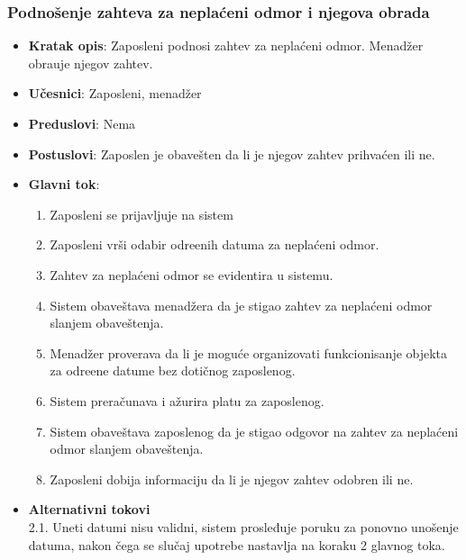  \subsubsection{Podno\v senje zahteva za nepla\'ceni odmor i njegova obrada }
 \begin{itemize}
    \item \textbf{Kratak opis}:
  Zaposleni podnosi zahtev za nepla\'ceni odmor. Menad\v zer obra\dj uje njegov zahtev.
    \item \textbf{Učesnici}:
    Zaposleni, menad\v zer
    \item \textbf{Preduslovi}: Nema
    \item \textbf{Postuslovi}:
    Zaposlen je obave\v sten da li je njegov zahtev prihva\'cen ili ne.
    \item \textbf{Glavni tok}:
    \begin{enumerate}
        \item Zaposleni se prijavljuje na sistem
        \item Zaposleni vr\v si odabir odre\dj enih datuma za nepla\'ceni odmor.
        \item Zahtev za nepla\'ceni odmor se evidentira u sistemu.
        \item Sistem obave\v stava menad\v zera da je stigao zahtev za nepla\'ceni odmor slanjem obaveštenja.
        \item Menad\v zer proverava da li je moguće organizovati funkcionisanje objekta za odre\dj ene datume bez dotičnog zaposlenog.
        \item Sistem prera\v cunava i a\v zurira platu za zaposlenog.
        \item Sistem obave\v stava zaposlenog da je stigao odgovor na zahtev za nepla\'ceni odmor slanjem obaveštenja.
        \item Zaposleni dobija informaciju da li je njegov zahtev odobren ili ne.
    \end{enumerate}
\item \textbf{Alternativni tokovi}\\
        2.1. Uneti datumi nisu validni, sistem prosleđuje poruku za ponovno unošenje datuma, nakon čega se slučaj upotrebe nastavlja na koraku 2 glavnog toka.

\end{itemize}
 
